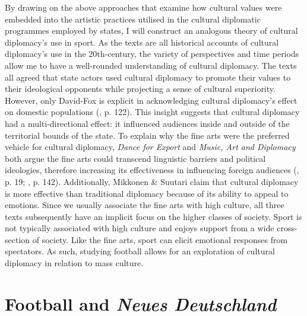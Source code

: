 By drawing on the above approaches that examine how cultural values were embedded into the artistic practices utilised in the cultural diplomatic programmes employed by states, I will construct an analogous theory of cultural diplomacy’s use in sport. As the texts are all historical accounts of cultural diplomacy’s use in the 20th-century, the variety of perspectives and time periods allow me to have a well-rounded understanding of cultural diplomacy. The texts all agreed that state actors used cultural diplomacy to promote their values to their ideological opponents while projecting a sense of cultural superiority. However, only David-Fox is explicit in acknowledging cultural diplomacy’s effect on domestic populations (\citeyear{david-fox2011}, p. 122). This insight suggests that cultural diplomacy had a multi-directional effect: it influenced audiences inside and outside of the territorial bounds of the state. To explain why the fine arts were the preferred vehicle for cultural diplomacy, \textit{Dance for Export} and \textit{Music, Art and Diplomacy} both argue the fine arts could transcend linguistic barriers and political ideologies, therefore increasing its effectiveness in influencing foreign audiences (\cite{prevots1998}, p. 19; \cite{gonçalves2016}, p. 142). Additionally, Mikkonen \& Suutari claim that cultural diplomacy is more effective than traditional diplomacy because of its ability to appeal to emotions. Since we usually associate the fine arts with high culture, all three texts subsequently have an implicit focus on the higher classes of society. Sport is not typically associated with high culture and enjoys support from a wide cross-section of society. Like the fine arts, sport can elicit emotional responses from spectators. As such, studying football allows for an exploration of cultural diplomacy in relation to mass culture.

\section{Football and \textit{Neues Deutschland}}

